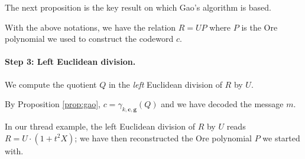 \documentclass[a4paper]{llncs}
\newcommand{\bc}{\textbf{c}}
\newcommand{\bg}{\textbf{g}}
\begin{document}
The next proposition is the key result on which Gao's algorithm is
based.

\begin{proposition}
\label{prop:gao}
With the above notations, we have the relation $R = UP$
where $P$ is the Ore polynomial we used to construct the codeword 
$c$.
\end{proposition}

\paragraph{Step 3: Left Euclidean division.}
We compute the quotient $Q$ in the \emph{left} Euclidean division 
of $R$ by $U$. 

\noindent
By Proposition \ref{prop:gao}, $c = \gamma_{k,\bc,\bg}(Q)$ and we 
have decoded the message $m$.

{\small
\begin{example}
In our thread example, the left Euclidean division of $R$ by $U$
reads $R = U \cdot (1 + t^2 X)$; we have then reconstructed the
Ore polynomial $P$ we started with.
\end{example}}
\end{document}

